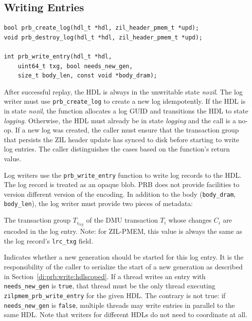 \documentclass[12pt,a4paper,twoside]{book}
\begin{document}

\subsection{Writing Entries}\label{di:prb:api:write}

\begin{lstlisting}
bool prb_create_log(hdl_t *hdl, zil_header_pmem_t *upd);
void prb_destroy_log(hdl_t *hdl, zil_header_pmem_t *upd);

int prb_write_entry(hdl_t *hdl,
    uint64_t txg, bool needs_new_gen,
    size_t body_len, const void *body_dram);
\end{lstlisting}

After successful replay, the HDL is always in the unwritable state \textit{nozil}.
The log writer must use \lstinline{prb_create_log} to create a new log idempotently.
If the HDL is in state \textit{nozil}, the function allocates a log GUID and transitions the HDL to state \textit{logging}.
Otherwise, the HDL must already be in state \textit{logging} and the call is a no-op.
If a new log was created, the caller must ensure that the transaction group that persists the ZIL header update has synced to disk before starting to write log entries.
The caller distinguishes the cases based on the function's return value.

Log writers use the \lstinline{prb_write_entry} function to write log records to the HDL.
The log record is treated as an opaque blob.
PRB does not provide facilities to version different version of the encoding.
In addition to the body (\lstinline{body_dram}, \lstinline{body_len}), the log writer must provide two pieces of metadata:
\begin{description}[noitemsep,leftmargin=1.5cm,labelindent=1cm]
    \item[txg] The transaction group $T_{i_{txg}}$ of the DMU transaction $T_i$ whose changes $C_i$ are encoded in the log entry.
        Note: for ZIL-PMEM, this value is always the same as the log record's \lstinline{lrc_txg} field.
    \item[needs\_new\_gen] Indicates whether a new generation should be started for this log entry.
        It is the responsibility of the caller to serialize the start of a new generation as described in Section~\ref{di:prb:write:hdlscoped}.
        If a thread writes an entry with \lstinline{needs_new_gen} is \lstinline{true}, that thread must be the only thread executing \lstinline{zilpmem_prb_write_entry} for the given HDL.
        The contrary is not true: if \lstinline{needs_new_gen} is \lstinline{false}, multiple threads may write entries in parallel to the same HDL.
        Note that writers for different HDLs do not need to coordinate at all.
\end{description}
\end{document}
